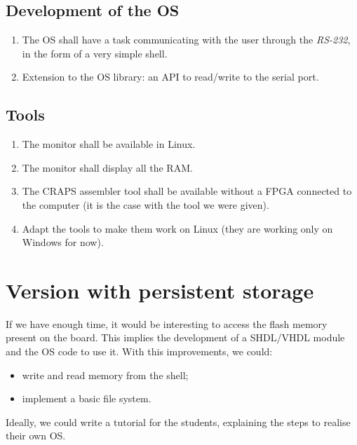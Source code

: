\documentclass{article}
\begin{document}
      \subsection{Development of the OS}
        \begin{enumerate}
          \item The OS shall have a task communicating with the user through
            the \textit{RS-232}, in the form of a very simple shell.
          \item Extension to the OS library: an API to read/write to the serial
            port.
        \end{enumerate}
      \subsection{Tools}
        \begin{enumerate}
          \item The monitor shall be available in Linux.
          \item The monitor shall display all the RAM.
          \item The CRAPS assembler tool shall be available without a FPGA connected to the computer (it is the case with the tool we were given).
          \item Adapt the tools to make them work on Linux (they are working only on Windows for now).
        \end{enumerate}

    \section{Version with persistent storage}
      If we have enough time, it would be interesting to access the flash memory
      present on the board. This implies the development of a SHDL/VHDL module
      and the OS code to use it. With this improvements, we could:
      \begin{itemize}
        \item write and read memory from the shell;
        \item implement a basic file system.
      \end{itemize}
      Ideally, we could write a tutorial for the students, explaining the steps
      to realise their own OS.

  \newpage
\end{document}
